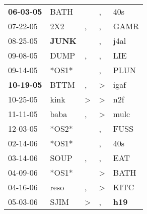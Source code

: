 \begin{supertabular}{p{0.07\textwidth}p{0.06\textwidth}p{0.02\textwidth}p{0.02\textwidth}p{0.06\textwidth}}
 \textbf{06-03-05\textsuperscript{}} &           BATH\textsuperscript{} &                  &                , &            40s\textsuperscript{} \\
          07-22-05\textsuperscript{} &            2X2\textsuperscript{} &                , &                , &           GAMR\textsuperscript{} \\
          08-25-05\textsuperscript{} &  \textbf{JUNK\textsuperscript{}} &                  &                , &           j4al\textsuperscript{} \\
          09-08-05\textsuperscript{} &           DUMP\textsuperscript{} &                , &                , &            LIE\textsuperscript{} \\
          09-14-05\textsuperscript{} &                            *OS1* &                  &                , &           PLUN\textsuperscript{} \\
 \textbf{10-19-05\textsuperscript{}} &           BTTM\textsuperscript{} &                , &     \textgreater &           igaf\textsuperscript{} \\
          10-25-05\textsuperscript{} &           kink\textsuperscript{} &     \textgreater &     \textgreater &            n2f\textsuperscript{} \\
          11-11-05\textsuperscript{} &           baba\textsuperscript{} &                , &     \textgreater &           mulc\textsuperscript{} \\
          12-03-05\textsuperscript{} &                            *OS2* &                  &                , &           FUSS\textsuperscript{} \\
          02-14-06\textsuperscript{} &                            *OS1* &                  &                , &            40s\textsuperscript{} \\
          03-14-06\textsuperscript{} &           SOUP\textsuperscript{} &                , &                , &            EAT\textsuperscript{} \\
          04-09-06\textsuperscript{} &                            *OS1* &                  &     \textgreater &           BATH\textsuperscript{} \\
          04-16-06\textsuperscript{} &           reso\textsuperscript{} &                , &     \textgreater &           KITC\textsuperscript{} \\
          05-03-06\textsuperscript{} &           SJIM\textsuperscript{} &     \textgreater &                , &   \textbf{h19\textsuperscript{}} \\

\end{supertabular}
